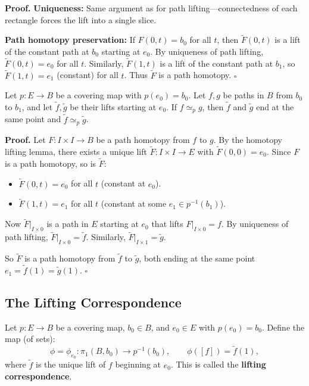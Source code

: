 \documentclass[11pt]{report}
\renewenvironment{proof}[1][Proof]{\noindent\textbf{#1.} }{\hfill$\square$\par\vspace{5pt}}
\begin{document}
\begin{proof}
\textbf{Uniqueness:} Same argument as for path lifting---connectedness of each rectangle forces the lift into a single slice.

\textbf{Path homotopy preservation:} If $F(0, t) = b_0$ for all $t$, then $\tilde{F}(0, t)$ is a lift of the constant path at $b_0$ starting at $e_0$. By uniqueness of path lifting, $\tilde{F}(0, t) = e_0$ for all $t$. Similarly, $\tilde{F}(1, t)$ is a lift of the constant path at $b_1$, so $\tilde{F}(1, t) = e_1$ (constant) for all $t$. Thus $\tilde{F}$ is a path homotopy.
\end{proof}

\begin{thmbox}
Let $p: E \to B$ be a covering map with $p(e_0) = b_0$. Let $f, g$ be paths in $B$ from $b_0$ to $b_1$, and let $\tilde{f}, \tilde{g}$ be their lifts starting at $e_0$. If $f \simeq_p g$, then $\tilde{f}$ and $\tilde{g}$ end at the same point and $\tilde{f} \simeq_p \tilde{g}$.
\end{thmbox}

\begin{proof}
Let $F: I \times I \to B$ be a path homotopy from $f$ to $g$. By the homotopy lifting lemma, there exists a unique lift $\tilde{F}: I \times I \to E$ with $\tilde{F}(0, 0) = e_0$. Since $F$ is a path homotopy, so is $\tilde{F}$:
\begin{itemize}[nosep]
    \item $\tilde{F}(0, t) = e_0$ for all $t$ (constant at $e_0$).
    \item $\tilde{F}(1, t) = e_1$ for all $t$ (constant at some $e_1 \in p^{-1}(b_1)$).
\end{itemize}
Now $\tilde{F}|_{I \times 0}$ is a path in $E$ starting at $e_0$ that lifts $F|_{I \times 0} = f$. By uniqueness of path lifting, $\tilde{F}|_{I \times 0} = \tilde{f}$. Similarly, $\tilde{F}|_{I \times 1} = \tilde{g}$.

So $\tilde{F}$ is a path homotopy from $\tilde{f}$ to $\tilde{g}$, both ending at the same point $e_1 = \tilde{f}(1) = \tilde{g}(1)$.
\end{proof}

\subsection{The Lifting Correspondence}

\begin{defbox}
Let $p: E \to B$ be a covering map, $b_0 \in B$, and $e_0 \in E$ with $p(e_0) = b_0$. Define the map (of sets):
\[\phi = \phi_{e_0}: \pi_1(B, b_0) \to p^{-1}(b_0), \qquad \phi([f]) = \tilde{f}(1),\]
where $\tilde{f}$ is the unique lift of $f$ beginning at $e_0$. This is called the \textbf{lifting correspondence}.
\end{defbox}
\end{document}
